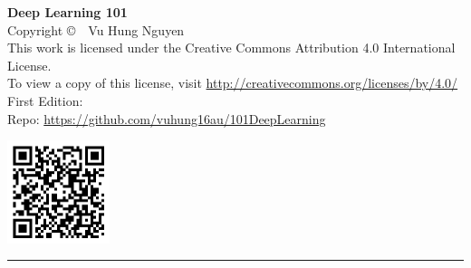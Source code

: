 \newpage
\thispagestyle{empty}

\vspace*{0.15\textheight}

\begin{center}
  \begin{tcolorbox}[
    enhanced,
    colback=softivory,
    colframe=warmstone,
    boxrule=0.6pt,
    arc=2pt,
    left=12pt,right=12pt,top=12pt,bottom=12pt,
    width=0.82\textwidth
  ]
    \begin{minipage}[t]{0.68\textwidth}
      \raggedright
      {\bfseries Deep Learning 101}\\
      Copyright \copyright~\the\year~Vu Hung Nguyen\\[0.5em]
      This work is licensed under the Creative Commons Attribution 4.0 International License.\\
      To view a copy of this license, visit \url{http://creativecommons.org/licenses/by/4.0/}\\[0.5em]
      First Edition: \DTMtoday\\[0.5em]
      Repo: {\ttfamily \mbox{\url{https://github.com/vuhung16au/101DeepLearning}}}
    \end{minipage}\hfill
    \begin{minipage}[t]{0.26\textwidth}
      \raggedleft
      \includegraphics[height=3cm]{images/DeepLearning101-QR-Code.png}
    \end{minipage}
    \par\vspace{8pt}
    {\color{warmstone}\rule{\linewidth}{0.3pt}}
  \end{tcolorbox}
\end{center}

\vfill
\clearpage
